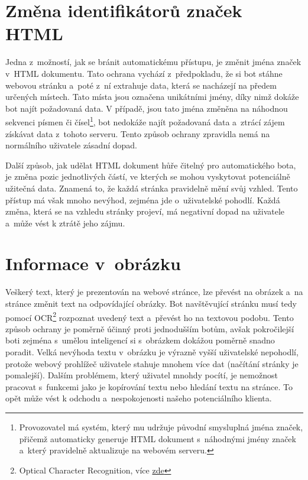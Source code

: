 \section*{Změna identifikátorů značek HTML}
Jedna z~možností, jak se bránit automatickému přístupu, je změnit jména značek v~HTML dokumentu. Tato ochrana vychází z~předpokladu, že si bot stáhne webovou stránku a~poté z~ní extrahuje data, která se nacházejí na předem určených místech. Tato místa jsou označena unikátními jmény, díky nimž dokáže bot najít požadovaná data. V případě, jsou tato jména změněna na náhodnou sekvenci písmen či čísel\footnote{Provozovatel má systém, který mu udržuje původní smysluplná jména značek, přičemž automaticky generuje HTML dokument s~náhodnými jmény značek a~který pravidelně aktualizuje na webovém serveru.}, bot nedokáže najít požadovaná data a~ztrácí zájem získávat data z~tohoto serveru. Tento způsob ochrany zpravidla nemá na normálního uživatele zásadní dopad.

Další způsob, jak udělat HTML dokument hůře čitelný pro automatického bota, je změna pozic jednotlivých částí, ve kterých se mohou vyskytovat potenciálně užitečná data. Znamená to, že každá stránka pravidelně mění svůj vzhled. Tento přístup má však mnoho nevýhod, zejména jde o~uživatelské pohodlí. Každá změna, která se na vzhledu stránky projeví, má negativní dopad na uživatele a~může vést k ztrátě jeho zájmu.

\section*{Informace v~obrázku}
Veškerý text, který je prezentován na webové stránce, lze převést na obrázek a~na stránce změnit text na odpovídající obrázky. Bot navštěvující stránku musí tedy pomocí OCR\footnote{Optical Character Recognition, více \href{https://en.wikipedia.org/wiki/Optical_character_recognition}{zde}} rozpoznat uvedený text a~převést ho na textovou podobu. Tento způsob ochrany je poměrně účinný proti jednodušším botům, avšak pokročilejší boti zejména s~umělou inteligencí si s~obrázkem dokážou poměrně snadno poradit. Velká nevýhoda textu v~obrázku je výrazně vyšší uživatelské nepohodlí, protože webový prohlížeč uživatele stahuje mnohem více dat (načítání stránky je pomalejší). Dalším problémem, který uživatel mnohdy pocítí, je nemožnost pracovat s~funkcemi jako je kopírování textu nebo hledání textu na stránce. To opět může vést k odchodu a~nespokojenosti našeho potenciálního klienta.

\bigskip


